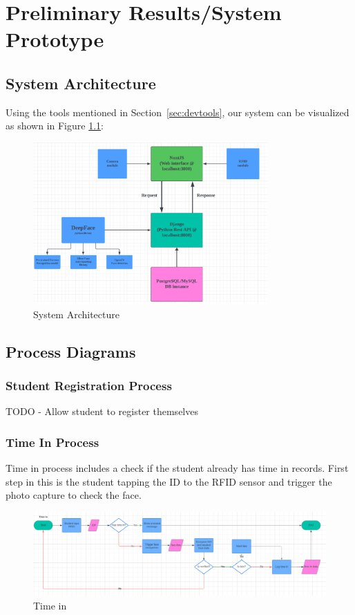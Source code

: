 \chapter{Preliminary Results/System Prototype}

\section{System Architecture}
Using the tools mentioned in Section~\ref{sec:devtools}, our system can be visualized as shown in Figure \ref{fig:architecture}: 
\begin{figure}[h] %
	\centering
	\includegraphics[width=0.8\textwidth]{figures/chapter4/architecture.png} %
	\caption{System Architecture}
	\label{fig:architecture}
\end{figure}
\section{Process Diagrams}

\subsection{Student Registration Process}
	TODO - Allow student to register themselves

\subsection{Time In Process}
	Time in process includes a check if the student already has time in records. First step in this is the student tapping the ID to the RFID sensor and trigger the photo capture to check the face.
	\begin{figure}[h] %
		\centering
		\includegraphics[width=1.0\textwidth]{figures/chapter4/timein.png} %
		\caption{Time in}
		\label{fig:timein}
	\end{figure}
	
